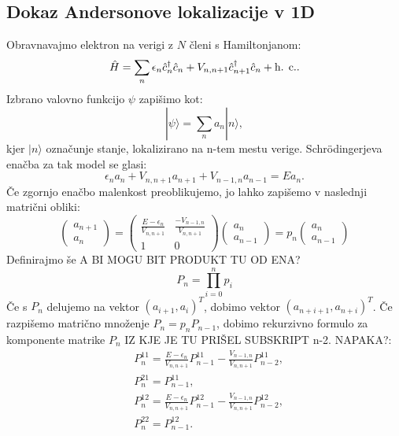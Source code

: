 \begin{appendices}
\chapter{Dokaz Andersonove lokalizacije v 1D}
Obravnavajmo elektron na verigi z $N$ členi s Hamiltonjanom:
\begin{equation}
\hat{H} = \sum_n \epsilon_n \hat{c}^\dagger_n \hat{c}_n + V_{n,n+1} \hat{c}^\dagger_{n+1} \hat{c}_n + \textup{h. c.}.
\end{equation}
Izbrano valovno funkcijo $\psi$ zapišimo kot:
\begin{equation}
| \psi \rangle = \sum_n a_n |n \rangle,
\end{equation}
kjer $| n \rangle$ označunje stanje, lokalizirano na n-tem mestu verige.
Schrödingerjeva enačba za tak model se glasi:
\begin{equation}
\epsilon_n a_n + V_{n , n+1} a_{n+1} + V_{n-1, n} a_{n-1} = E a_n.
\end{equation} 
Če zgornjo enačbo malenkost preoblikujemo, jo lahko zapišemo v naslednji matrični obliki:
\begin{equation}
\begin{pmatrix}
a_{n+1} \\ a_n 
\end{pmatrix}
=
\begin{pmatrix}
\frac{E-\epsilon_n}{V_{n,n+1}} & \frac{-V_{n-1,n}}{V_{n,n+1}} \\ 1 & 0 
\end{pmatrix}
\begin{pmatrix}
a_{n} \\ a_{n-1} 
\end{pmatrix}
= p_n 
\begin{pmatrix}
a_{n} \\ a_{n-1} 
\end{pmatrix}
\end{equation}
Definirajmo še A BI MOGU BIT PRODUKT TU OD ENA?
\begin{equation}
P_n = \prod_{i=0}^n p_i 
\end{equation}
Če s $P_n$ delujemo na vektor $(a_{i+1}, a_i)^T$, dobimo vektor $(a_{n+i+1}, a_{n+i})^T$.
Če razpišemo matrično množenje $P_n = p_n P_{n-1}$, dobimo rekurzivno formulo za komponente matrike $P_n$ IZ KJE JE TU PRIŠEL SUBSKRIPT n-2. NAPAKA?:
\begin{align}
&P_n^{11} = \frac{E-\epsilon_n}{V_{n,n+1}} P_{n-1}^{11} - \frac{V_{n-1,n}}{V_{n,n+1}} P_{n-2}^{11}, \\
&P_n^{21} = P_{n-1}^{11}, \\
&P_n^{12} = \frac{E-\epsilon_n}{V_{n,n+1}} P_{n-1}^{12} - \frac{V_{n-1,n}}{V_{n,n+1}} P_{n-2}^{12}, \\
&P_n^{22} = P_{n-1}^{12}.
\end{align}


\end{appendices}
